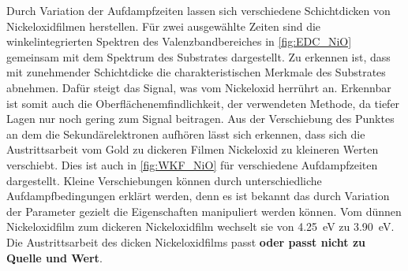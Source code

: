         Durch Variation der Aufdampfzeiten lassen sich verschiedene Schichtdicken von Nickeloxidfilmen herstellen.
        Für zwei ausgewählte Zeiten sind die winkelintegrierten Spektren des Valenzbandbereiches in \autoref{fig:EDC_NiO} gemeinsam mit dem Spektrum des Substrates dargestellt.
        Zu erkennen ist, dass mit zunehmender Schichtdicke die charakteristischen Merkmale des Substrates abnehmen.
        Dafür steigt das Signal, was vom Nickeloxid herrührt an.
        Erkennbar ist somit auch die Oberflächenemfindlichkeit, der verwendeten Methode, da tiefer Lagen nur noch gering zum Signal beitragen.
        Aus der Verschiebung des Punktes an dem die Sekundärelektronen aufhören lässt sich erkennen, dass sich die Austrittsarbeit vom Gold zu dickeren Filmen Nickeloxid zu kleineren Werten verschiebt.
        Dies ist auch in \autoref{fig:WKF_NiO} für verschiedene Aufdampfzeiten dargestellt. 
        Kleine Verschiebungen können durch unterschiedliche Aufdampfbedingungen erklärt werden, denn es ist bekannt das durch Variation der Parameter gezielt die Eigenschaften manipuliert werden können.
        Vom dünnen Nickeloxidfilm zum dickeren Nickeloxidfilm wechselt sie von \SI{4.25}{\electronvolt} zu \SI{3.90}{\electronvolt}.
        Die Austrittsarbeit des dicken Nickeloxidfilms passt \textbf{oder passt nicht zu Quelle und Wert}.

